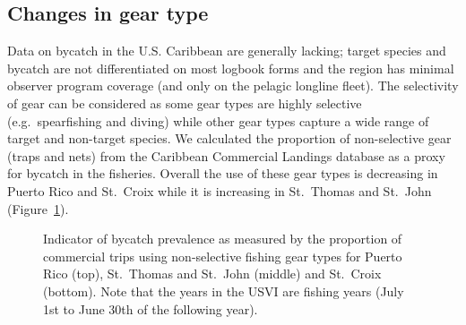 \documentclass[
  letterpaper,
  oneside,
  open=any]{scrbook}
\begin{document}
\subsection{Changes in gear type}\label{changes-in-gear-type}

Data on bycatch in the U.S. Caribbean are generally lacking; target
species and bycatch are not differentiated on most logbook forms and the
region has minimal observer program coverage (and only on the pelagic
longline fleet). The selectivity of gear can be considered as some gear
types are highly selective (e.g.~spearfishing and diving) while other
gear types capture a wide range of target and non-target species. We
calculated the proportion of non-selective gear (traps and nets) from
the Caribbean Commercial Landings database as a proxy for bycatch in the
fisheries. Overall the use of these gear types is decreasing in Puerto
Rico and St.~Croix while it is increasing in St.~Thomas and St.~John
(Figure~\ref{fig-bycatch}).

\begin{figure}


\caption{\label{fig-bycatch}Indicator of bycatch prevalence as measured
by the proportion of commercial trips using non-selective fishing gear
types for Puerto Rico (top), St.~Thomas and St.~John (middle) and
St.~Croix (bottom). Note that the years in the USVI are fishing years
(July 1st to June 30th of the following year).}

\end{figure}%
\end{document}
